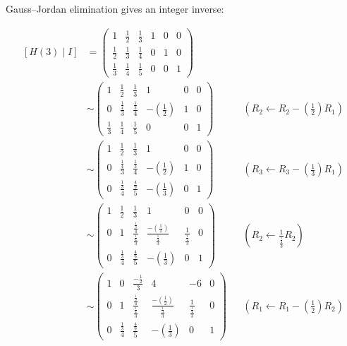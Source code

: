 \documentclass[11pt]{article}
\begin{document}
Gauss--Jordan elimination gives an integer inverse:

\[\begin{aligned}\left[H\left(3\right)\mid I\right] &= \begin{pmatrix}1 & \frac{1}{2} & \frac{1}{3} & 1 & 0 & 0 \\ \frac{1}{2} & \frac{1}{3} & \frac{1}{4} & 0 & 1 & 0 \\ \frac{1}{3} & \frac{1}{4} & \frac{1}{5} & 0 & 0 & 1\end{pmatrix} \\
&\sim \begin{pmatrix}1 & \frac{1}{2} & \frac{1}{3} & 1 & 0 & 0 \\ 0 & \frac{\frac{1}{4}}{3} & \frac{\frac{1}{3}}{4} & -\left(\frac{1}{2}\right) & 1 & 0 \\ \frac{1}{3} & \frac{1}{4} & \frac{1}{5} & 0 & 0 & 1\end{pmatrix} && \left(R_{2}\leftarrow R_{2}-\left(\frac{1}{2}\right)R_{1}\right) \\
&\sim \begin{pmatrix}1 & \frac{1}{2} & \frac{1}{3} & 1 & 0 & 0 \\ 0 & \frac{\frac{1}{4}}{3} & \frac{\frac{1}{3}}{4} & -\left(\frac{1}{2}\right) & 1 & 0 \\ 0 & \frac{\frac{1}{3}}{4} & \frac{\frac{4}{9}}{5} & -\left(\frac{1}{3}\right) & 0 & 1\end{pmatrix} && \left(R_{3}\leftarrow R_{3}-\left(\frac{1}{3}\right)R_{1}\right) \\
&\sim \begin{pmatrix}1 & \frac{1}{2} & \frac{1}{3} & 1 & 0 & 0 \\ 0 & 1 & \frac{\frac{\frac{1}{3}}{4}}{\frac{\frac{1}{4}}{3}} & \frac{-\left(\frac{1}{2}\right)}{\frac{\frac{1}{4}}{3}} & \frac{1}{\frac{\frac{1}{4}}{3}} & 0 \\ 0 & \frac{\frac{1}{3}}{4} & \frac{\frac{4}{9}}{5} & -\left(\frac{1}{3}\right) & 0 & 1\end{pmatrix} && \left(R_{2}\leftarrow \frac{1}{\frac{\frac{1}{4}}{3}}R_{2}\right) \\
&\sim \begin{pmatrix}1 & 0 & \frac{-\frac{1}{2}}{3} & 4 & -6 & 0 \\ 0 & 1 & \frac{\frac{\frac{1}{3}}{4}}{\frac{\frac{1}{4}}{3}} & \frac{-\left(\frac{1}{2}\right)}{\frac{\frac{1}{4}}{3}} & \frac{1}{\frac{\frac{1}{4}}{3}} & 0 \\ 0 & \frac{\frac{1}{3}}{4} & \frac{\frac{4}{9}}{5} & -\left(\frac{1}{3}\right) & 0 & 1\end{pmatrix} && \left(R_{1}\leftarrow R_{1}-\left(\frac{1}{2}\right)R_{2}\right) \\

\end{aligned}\]
\end{document}
